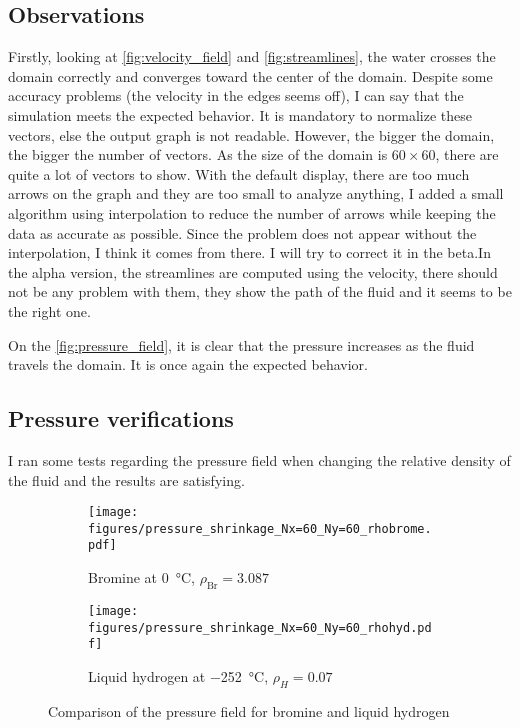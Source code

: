 \subsection{Observations}
Firstly, looking at \autoref{fig:velocity_field} and \autoref{fig:streamlines},
the water crosses the domain correctly and converges toward the center of the
domain. Despite some accuracy problems (the velocity in the edges seems off),
I can say that the simulation meets the expected behavior. It is mandatory to
normalize these vectors, else the output graph is not readable. However, the
bigger the domain, the bigger the number of vectors. As the size of the domain 
is $\num{60} \times \num{60}$, there are quite a lot of vectors to show. With
the default display, there are too much arrows on the graph and they are too
small to analyze anything, I added a small algorithm using interpolation to
reduce the number of arrows while keeping the data as accurate as possible.
Since the problem does not appear without the interpolation, I think it comes
from there. I will try to correct it in the beta.In the alpha version, the
streamlines are computed using the velocity, there should not be any problem
with them, they show the path of the fluid and it seems to be the right one.

On the \autoref{fig:pressure_field}, it is clear that the pressure increases as
the fluid travels the domain. It is once again the expected behavior.

\subsection{Pressure verifications}
I ran some tests regarding the pressure field when changing the relative
density of the fluid and the results are satisfying.

\begin{figure}[htbp]
      \centering
      \begin{subfigure}{.45\textwidth}
            \texttt{[image: figures/pressure\_shrinkage\_Nx=60\_Ny=60\_rhobrome.pdf]}
            \caption{Bromine at \SI{0}{\celsius}, $\rho_{\text{Br}} = 3.087$}\label{fig:pressure_brome}
      \end{subfigure}
      \begin{subfigure}{.45\textwidth}
            \texttt{[image: figures/pressure\_shrinkage\_Nx=60\_Ny=60\_rhohyd.pdf]}
            \caption{Liquid hydrogen at \SI{-252}{\celsius}, $\rho_{H} = 0.07$}\label{fig:pressure_hydrogen}
      \end{subfigure}
      \caption{Comparison of the pressure field for bromine and liquid hydrogen}
      \label{fig:pressure_com}
\end{figure}

